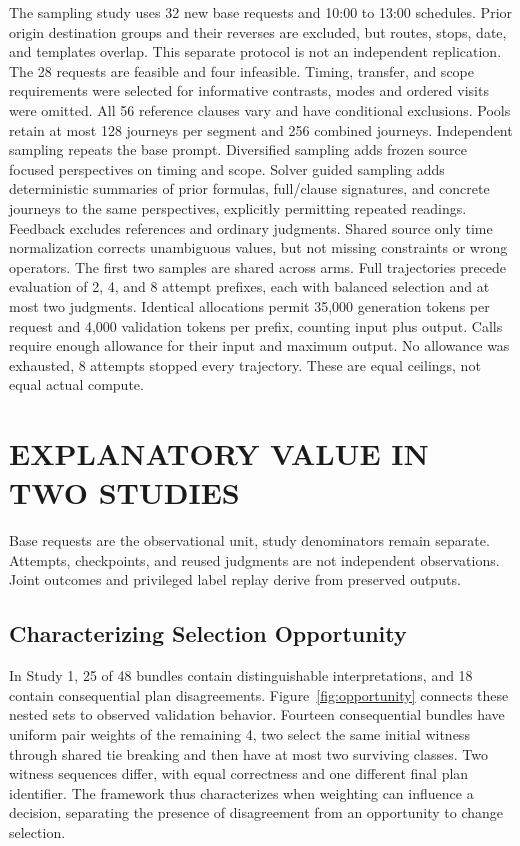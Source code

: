 \documentclass[a4paper,twoside]{article}
\begin{document}
The sampling study uses 32 new base requests and 10:00 to 13:00 schedules. Prior origin destination groups and their reverses are excluded, but routes, stops, date, and templates overlap. This separate protocol is not an independent replication. The 28 requests are feasible and four infeasible. Timing, transfer, and scope requirements were selected for informative contrasts, modes and ordered visits were omitted. All 56 reference clauses vary and have conditional exclusions. Pools retain at most 128 journeys per segment and 256 combined journeys.
Independent sampling repeats the base prompt. Diversified sampling adds frozen source focused perspectives on timing and scope. Solver guided sampling adds deterministic summaries of prior formulas, full/clause signatures, and concrete journeys to the same perspectives, explicitly permitting repeated readings. Feedback excludes references and ordinary judgments. Shared source only time normalization corrects unambiguous values, but not missing constraints or wrong operators.
The first two samples are shared across arms. Full trajectories precede evaluation of 2, 4, and 8 attempt prefixes, each with balanced selection and at most two judgments. Identical allocations permit 35,000 generation tokens per request and 4,000 validation tokens per prefix, counting input plus output. Calls require enough allowance for their input and maximum output. No allowance was exhausted, 8 attempts stopped every trajectory. These are equal ceilings, not equal actual compute.



\section{\uppercase{Explanatory Value in Two Studies}}
\label{sec:findings}

\noindent Base requests are the observational unit, study denominators remain separate. Attempts, checkpoints, and reused judgments are not independent observations. Joint outcomes and privileged label replay derive from preserved outputs.

\subsection{Characterizing Selection Opportunity}

In Study 1, 25 of 48 bundles contain distinguishable interpretations, and 18 contain consequential plan disagreements. Figure~\ref{fig:opportunity} connects these nested sets to observed validation behavior. Fourteen consequential bundles have uniform pair weights of the remaining 4, two select the same initial witness through shared tie breaking and then have at most two surviving classes. Two witness sequences differ, with equal correctness and one different final plan identifier. The framework thus characterizes when weighting can influence a decision, separating the presence of disagreement from an opportunity to change selection.
\end{document}

